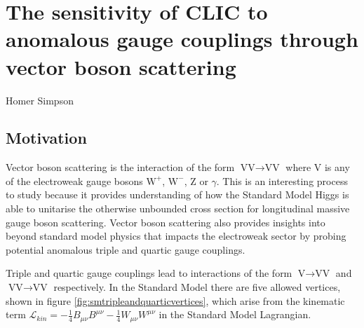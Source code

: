 \chapter{The sensitivity of CLIC to anomalous gauge couplings through vector boson scattering}
\label{chap:PhysicsAnalysis}

%
{Homer Simpson}


\section{Motivation}
Vector boson scattering is the interaction of the form $\text{VV} \rightarrow \text{VV}$ where V is any of the electroweak gauge bosons $\text{W}^{+}$, $\text{W}^{-}$, Z or $\gamma$.  This is an interesting process to study because it provides understanding of how the Standard Model Higgs is able to unitarise the otherwise unbounded cross section for longitudinal massive gauge boson scattering.  Vector boson scattering also provides insights into beyond standard model physics that impacts the electroweak sector by probing potential anomalous triple and quartic gauge couplings.  

Triple and quartic gauge couplings lead to interactions of the form $\text{V} \rightarrow \text{VV}$ and $\text{VV} \rightarrow \text{VV}$ respectively.  In the Standard Model there are five allowed vertices, shown in figure \ref{fig:smtripleandquarticvertices}, which arise from the kinematic term $\mathcal{L}_{kin} = -\frac{1}{4}B_{\mu\nu}B^{\mu\nu} - \frac{1}{4}W_{\mu\nu}W^{\mu\nu}$ in the Standard Model Lagrangian.

